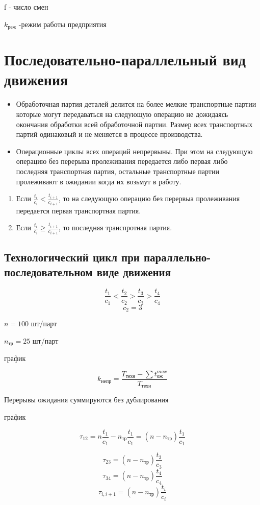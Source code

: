 \documentclass[14pt,a4paper,oneside]{extarticle}
\begin{document}
f - число смен

$k_\text{реж}$ -режим работы предприятия

\section{Последовательно-параллельный вид движения}


\begin{itemize}
    \item Обработочная партия деталей делится на более мелкие транспортные партии которые могут передаваться на следующую операцию не дожидаясь окончания обработки всей обработочной партии. Размер всех транспортных партий одинаковый и не меняется в процессе производства.
    \item Операционные циклы всех операций непрервыны. При этом на следующую операцию без перерыва пролеживания передается либо первая либо последняя транспортная партия, остальные транспортные партии пролеживают в ожидании когда их возьмут в работу.
\end{itemize}

\begin{enumerate}
    \item Если $\frac{t_i}{c_i}<\frac{t_{i+1}}{c_{i+1}}$, то на следующую операцию без перервыа пролеживания передается первая транспортная партия.
    \item Если $\frac{t_i}{c_i}\geq \frac{t_{i+1}}{c_{i+1}}$, то последняя транспротная партия.
\end{enumerate}

\subsection{Технологический цикл при параллельно-последовательном виде движения}

\[\frac{t_1}{c_1}<\frac{t_2}{c_2}>\frac{t_3}{c_3}>\frac{t_4}{c_4}\]
\[c_2=3\]

$n=100$ шт/парт

$n_{\text{тр}}=25$ шт/парт

график

\[k_\text{непр}=\frac{T_\text{техн}-\sum t_\text{ож}^{max}}{T_\text{техн}}\]

Перерывы ожидания суммируются без дублирования

график

\[\tau_{12}=n\frac{t_1}{c_1}-n_\text{тр}\frac{t_1}{c_1}=(n-n_\text{тр})\frac{t_1}{c_1}\]

\[\tau_{23}=(n-n_\text{тр})\frac{t_3}{c_3}\]
\[\tau_{34}=(n-n_\text{тр})\frac{t_4}{c_4}\]
\[\tau_{i,i+1}=(n-n_\text{тр})\frac{t_i}{c_i}\]
\end{document}
